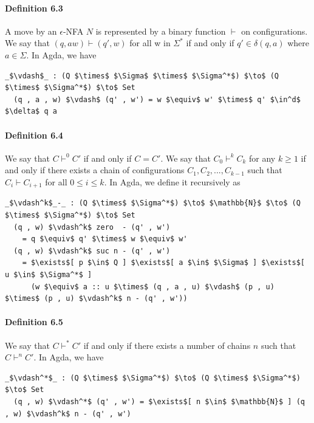 \documentclass[twoside,openright,final]{bhamthesis}
\begin{document}
\paragraph{Definition 6.3} A move by an \(\epsilon\)-NFA \(N\) is
represented by a binary function \(\vdash\) on configurations. We say
that \((q, aw) \vdash (q' , w)\) for all w in \(\Sigma^*\)
if and only if \(q' \in \delta (q , a)\) where \(a \in \Sigma\). In
Agda, we have
\begin{lstlisting}[mathescape=true,aboveskip=0pt,belowskip=0pt]
  _$\vdash$_ : (Q $\times$ $\Sigma$ $\times$ $\Sigma^*$) $\to$ (Q $\times$ $\Sigma^*$) $\to$ Set
  (q , a , w) $\vdash$ (q' , w') = w $\equiv$ w' $\times$ q' $\in^d$ $\delta$ q a
\end{lstlisting}

\paragraph{Definition 6.4} We say that \(C \vdash^0 C'\) if and only
if \(C = C'\). We say that \(C_0 \vdash^k C_k\) for any \(k \geq 1\) if and only if there exists a chain of
configurations \(C_1, C_2, ..., C_{k-1}\) such that \(C_i \vdash
C_{i+1}\) for all \(0 \leq i \leq k\). In Agda, we define it
recursively as
\begin{lstlisting}[mathescape=true,aboveskip=0pt,belowskip=0pt]
  _$\vdash^k$_-_ : (Q $\times$ $\Sigma^*$) $\to$ $\mathbb{N}$ $\to$ (Q $\times$ $\Sigma^*$) $\to$ Set
  (q , w) $\vdash^k$ zero  - (q' , w')
    = q $\equiv$ q' $\times$ w $\equiv$ w'
  (q , w) $\vdash^k$ suc n - (q' , w') 
    = $\exists$[ p $\in$ Q ] $\exists$[ a $\in$ $\Sigma$ ] $\exists$[ u $\in$ $\Sigma^*$ ]
      (w $\equiv$ a :: u $\times$ (q , a , u) $\vdash$ (p , u) $\times$ (p , u) $\vdash^k$ n - (q' , w'))
\end{lstlisting}

\paragraph{Definition 6.5} We say that \(C \vdash^* C'\) if and only
if there exists a number of chains \(n\) such that \(C \vdash^n C'\). In Agda,
we have
\begin{lstlisting}[mathescape=true,aboveskip=0pt,belowskip=0pt]
  _$\vdash^*$_ : (Q $\times$ $\Sigma^*$) $\to$ (Q $\times$ $\Sigma^*$) $\to$ Set
  (q , w) $\vdash^*$ (q' , w') = $\exists$[ n $\in$ $\mathbb{N}$ ] (q , w) $\vdash^k$ n - (q' , w')
\end{lstlisting}
\end{document}
